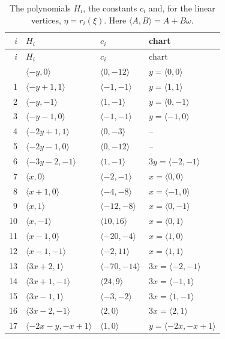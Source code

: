 \documentclass[11pt]{article}
\begin{document}
\clearpage
\begingroup\small
\setlength{\LTcapwidth}{\textwidth}
\begin{longtable}{@{}rlll@{}}
\caption{The polynomials $H_i$, the constants $c_i$ and, for the linear vertices, $\eta=r_i(\xi)$. Here $\langle A,B\rangle=A+B\omega$.}\label{tab:vert1}\\
\hline $i$ & $H_i$ & $c_i$ & chart\\\hline\endfirsthead\hline $i$ & $H_i$ & $c_i$ & chart\\\hline\endhead\hline\endfoot
0 & $\langle -y,0\rangle$ & $\langle 0,-12\rangle$ & $y=\langle 0,0\rangle$\\
1 & $\langle -y+1,1\rangle$ & $\langle -1,-1\rangle$ & $y=\langle 1,1\rangle$\\
2 & $\langle -y,-1\rangle$ & $\langle 1,-1\rangle$ & $y=\langle 0,-1\rangle$\\
3 & $\langle -y-1,0\rangle$ & $\langle -1,-1\rangle$ & $y=\langle -1,0\rangle$\\
4 & $\langle -2y+1,1\rangle$ & $\langle 0,-3\rangle$ & --\\
5 & $\langle -2y-1,0\rangle$ & $\langle 0,-12\rangle$ & --\\
6 & $\langle -3y-2,-1\rangle$ & $\langle 1,-1\rangle$ & $3y=\langle -2,-1\rangle$\\
7 & $\langle x,0\rangle$ & $\langle -2,-1\rangle$ & $x=\langle 0,0\rangle$\\
8 & $\langle x+1,0\rangle$ & $\langle -4,-8\rangle$ & $x=\langle -1,0\rangle$\\
9 & $\langle x,1\rangle$ & $\langle -12,-8\rangle$ & $x=\langle 0,-1\rangle$\\
10 & $\langle x,-1\rangle$ & $\langle 10,16\rangle$ & $x=\langle 0,1\rangle$\\
11 & $\langle x-1,0\rangle$ & $\langle -20,-4\rangle$ & $x=\langle 1,0\rangle$\\
12 & $\langle x-1,-1\rangle$ & $\langle -2,11\rangle$ & $x=\langle 1,1\rangle$\\
13 & $\langle 3x+2,1\rangle$ & $\langle -70,-14\rangle$ & $3x=\langle -2,-1\rangle$\\
14 & $\langle 3x+1,-1\rangle$ & $\langle 24,9\rangle$ & $3x=\langle -1,1\rangle$\\
15 & $\langle 3x-1,1\rangle$ & $\langle -3,-2\rangle$ & $3x=\langle 1,-1\rangle$\\
16 & $\langle 3x-2,-1\rangle$ & $\langle 2,0\rangle$ & $3x=\langle 2,1\rangle$\\
17 & $\langle -2x-y,-x+1\rangle$ & $\langle 1,0\rangle$ & $y=\langle -2x,-x+1\rangle$\\

\end{longtable}
\end{document}

